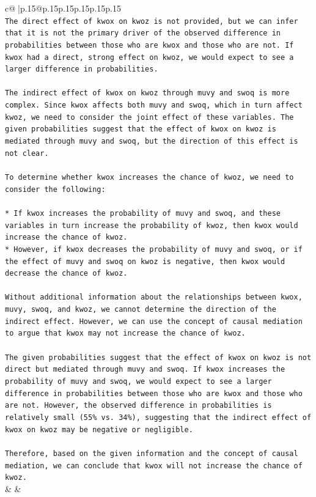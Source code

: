 \documentclass{article}
\begin{document}
{\begin{supertabular}{c@{$\;$}|p{.15\linewidth}@{}p{.15\linewidth}p{.15\linewidth}p{.15\linewidth}p{.15\linewidth}p{.15\linewidth}}
{{{\\ 
\texttt{The direct effect of kwox on kwoz is not provided, but we can infer that it is not the primary driver of the observed difference in probabilities between those who are kwox and those who are not. If kwox had a direct, strong effect on kwoz, we would expect to see a larger difference in probabilities.} \\
\\ 
\texttt{The indirect effect of kwox on kwoz through muvy and swoq is more complex. Since kwox affects both muvy and swoq, which in turn affect kwoz, we need to consider the joint effect of these variables. The given probabilities suggest that the effect of kwox on kwoz is mediated through muvy and swoq, but the direction of this effect is not clear.} \\
\\ 
\texttt{To determine whether kwox increases the chance of kwoz, we need to consider the following:} \\
\\ 
\texttt{* If kwox increases the probability of muvy and swoq, and these variables in turn increase the probability of kwoz, then kwox would increase the chance of kwoz.} \\
\texttt{* However, if kwox decreases the probability of muvy and swoq, or if the effect of muvy and swoq on kwoz is negative, then kwox would decrease the chance of kwoz.} \\
\\ 
\texttt{Without additional information about the relationships between kwox, muvy, swoq, and kwoz, we cannot determine the direction of the indirect effect. However, we can use the concept of causal mediation to argue that kwox may not increase the chance of kwoz.} \\
\\ 
\texttt{The given probabilities suggest that the effect of kwox on kwoz is not direct but mediated through muvy and swoq. If kwox increases the probability of muvy and swoq, we would expect to see a larger difference in probabilities between those who are kwox and those who are not. However, the observed difference in probabilities is relatively small (55\% vs. 34\%), suggesting that the indirect effect of kwox on kwoz may be negative or negligible.} \\
\\ 
\texttt{Therefore, based on the given information and the concept of causal mediation, we can conclude that kwox will not increase the chance of kwoz.} \\
            }
        }
    }
    & & \\ \\


\end{supertabular}}
\end{document}
